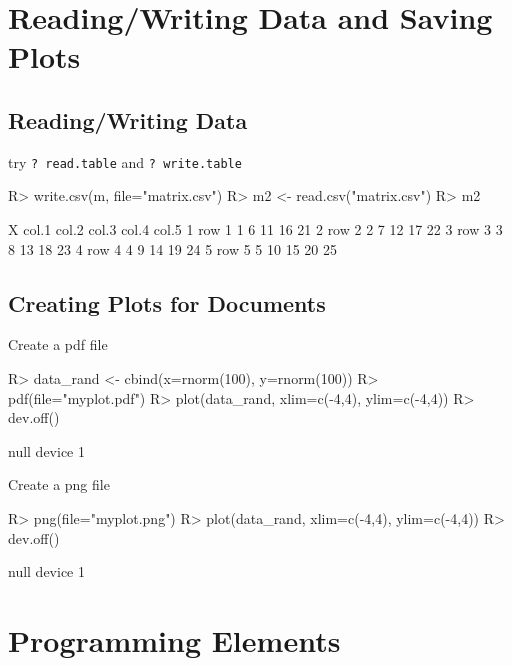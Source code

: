 \documentclass[fleqn, letter, 10pt]{article}
\begin{document}
\section{Reading/Writing Data and Saving Plots}
\subsection{Reading/Writing Data}

try \verb|? read.table| and \verb|? write.table|

\begin{Schunk}
\begin{Sinput}
R> write.csv(m, file="matrix.csv")
R> m2 <- read.csv("matrix.csv")
R> m2
\end{Sinput}
\begin{Soutput}
      X col.1 col.2 col.3 col.4 col.5
1 row 1     1     6    11    16    21
2 row 2     2     7    12    17    22
3 row 3     3     8    13    18    23
4 row 4     4     9    14    19    24
5 row 5     5    10    15    20    25
\end{Soutput}
\end{Schunk}

\subsection{Creating Plots for Documents}

Create a pdf file
\begin{Schunk}
\begin{Sinput}
R> data_rand <- cbind(x=rnorm(100), y=rnorm(100))
R> pdf(file="myplot.pdf")
R> plot(data_rand, xlim=c(-4,4), ylim=c(-4,4))
R> dev.off()
\end{Sinput}
\begin{Soutput}
null device 
          1 
\end{Soutput}
\end{Schunk}

Create a png file
\begin{Schunk}
\begin{Sinput}
R> png(file="myplot.png")
R> plot(data_rand, xlim=c(-4,4), ylim=c(-4,4))
R> dev.off()
\end{Sinput}
\begin{Soutput}
null device 
          1 
\end{Soutput}
\end{Schunk}

\section{Programming Elements}
\end{document}
